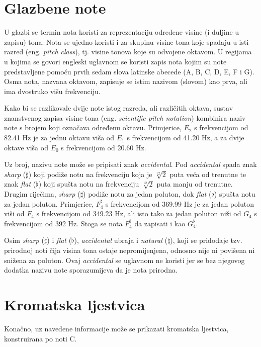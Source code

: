 \documentclass[times, utf8, zavrsni, numeric]{fer}
\begin{document}
\section{Glazbene note}
U glazbi se termin nota koristi za reprezentaciju određene visine (i duljine u zapisu) tona. Nota se ujedno koristi i za skupinu visine tona koje spadaju u isti razred (eng. \textit{pitch class}), tj. visine tonova koje su odvojene oktavom. U regijama u kojima se govori engleski uglavnom se koristi zapis nota kojim su note predstavljene pomoću prvih sedam slova latinske abecede (A, B, C, D, E, F i G). Osma nota, nazvana oktavom, zapisuje se istim nazivom (slovom) kao prva, ali ima dvostruko višu frekvenciju. 

Kako bi se razlikovale dvije note istog razreda, ali različitih oktava, sustav znanstvenog zapisa visine tona (eng. \textit{scientific pitch notation}) kombinira naziv note s brojem koji označava određenu oktavu. 
Primjerice, $E_2$ s frekvencijom od 82.41 Hz je za jednu oktavu viša od $E_1$ s frekvencijom od 41.20 Hz, a za dvije oktave viša od $E_0$ s frekvencijom od 20.60 Hz.

Uz broj, nazivu note može se pripisati znak \textit{accidental}. Pod \textit{accidental} spada znak \textit{sharp} ($\sharp$) koji podiže notu na frekvenciju koja je $\sqrt[12]{2}$ puta veća od trenutne te znak \textit{flat} ($\flat$) koji spušta notu na frekvenciju $\sqrt[12]{2}$ puta manju od trenutne. Drugim riječima, \textit{sharp} ($\sharp$) podiže notu za jedan poluton, dok \textit{flat} ($\flat$) spušta notu za jedan poluton. 
Primjerice, $F_4^\sharp$ s frekvencijom od 369.99 Hz je za jedan poluton viši od $F_4$ s frekvencijom od 349.23 Hz, ali isto tako za jedan poluton niži od $G_4$ s frekvencijom od 392 Hz. Stoga se nota $F_4^\sharp$ da zapisati i kao $G_4^\flat$.

Osim \textit{sharp} ($\sharp$) i \textit{flat} ($\flat$), \textit{accidental} ubraja i \textit{natural} ($\natural$), koji se pridodaje tzv. prirodnoj noti čija visina tona ostaje nepromijenjena, odnosno nije ni povišena ni snižena za poluton.\cite{benward2003introduction} Ovaj \textit{accidental} se uglavnom ne koristi jer se bez njegovog dodatka nazivu note sporazumijeva da je nota prirodna.

\section{Kromatska ljestvica}
Konačno, uz navedene informacije može se prikazati kromatska ljestvica, konstruirana po noti C.
\end{document}
